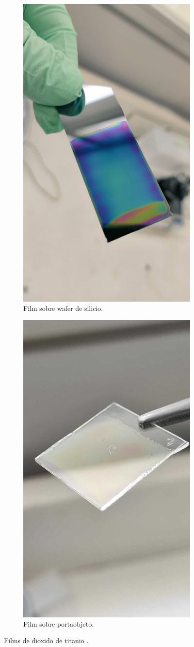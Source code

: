 \begin{figure}[!htpb]
     \centering
     \begin{subfigure}[b]{0.4\textwidth}
         \centering
         \includegraphics[width=.5\textwidth]{./Figures/muestra_1.pdf}
         \caption{Film sobre wafer de silicio.}
         \label{fig:muestra_1}
     \end{subfigure}
     \hfill
     \begin{subfigure}[b]{0.4\textwidth}
         \centering
         \includegraphics[width=.5\textwidth]{./Figures/muestra_2.pdf}
         \caption{Film sobre portaobjeto.}
         \label{fig:muestra_"}
     \end{subfigure}
     \hfill
        \caption{Films de dioxido de titanio  \protect\footnotemark.}
        \label{fig:muestras}
\end{figure}

